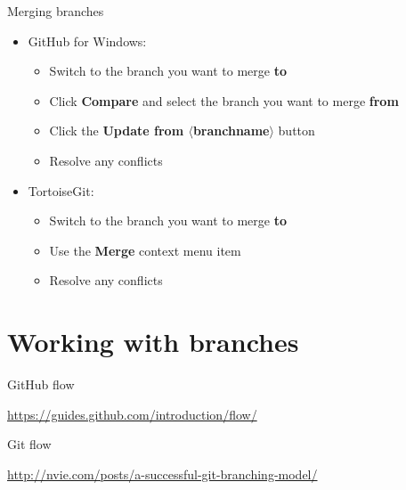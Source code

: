 \begin{frame}{Merging branches}
    \begin{itemize}
        \item GitHub for Windows:
            \begin{itemize}
                \item Switch to the branch you want to merge \textbf{to}
                \item Click \textbf{Compare} and select the branch you want to merge \textbf{from}
                \item Click the \textbf{Update from $\langle$branchname$\rangle$} button
                \item Resolve any conflicts
            \end{itemize}
        \item TortoiseGit:
            \begin{itemize}
                \item Switch to the branch you want to merge \textbf{to}
                \item Use the \textbf{Merge} context menu item
                \item Resolve any conflicts
            \end{itemize}
    \end{itemize}
\end{frame}

\part{Working with branches}
\frame{\partpage}

\begin{frame}{GitHub flow}
    \begin{center}
        \url{https://guides.github.com/introduction/flow/}
    \end{center}
\end{frame}

{

}

\begin{frame}{Git flow}
    \begin{center}
        \url{http://nvie.com/posts/a-successful-git-branching-model/}
    \end{center}
\end{frame}


